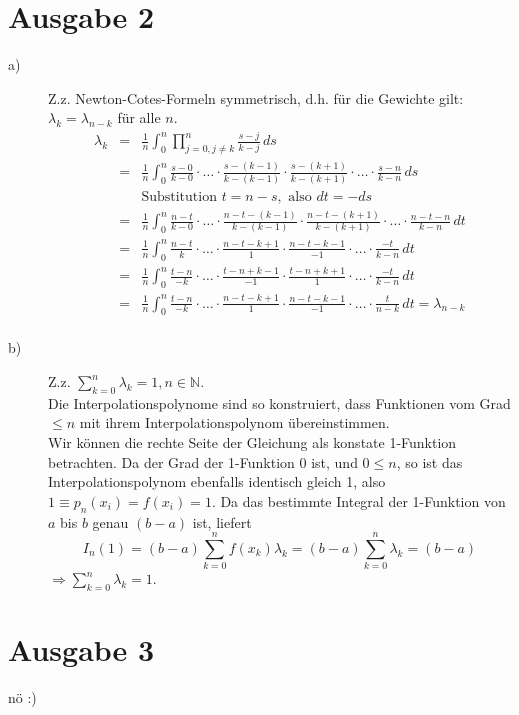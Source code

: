 \documentclass[11pt,a4paper,ngerman]{article}
\begin{document}
\newpage

\section*{Ausgabe 2}
\begin{description}
\item[a)] Z.z. Newton-Cotes-Formeln symmetrisch, d.h. für die Gewichte gilt: $\lambda_k = \lambda_{n-k}$ für alle $n$. \\
\begin{eqnarray*}
 \lambda_k &=& \frac{1}{n} \int_0^n{\prod_{j=0,j\neq k}^n{\frac{s-j}{k-j}} \, ds} \\
 &=&\frac{1}{n} \int_0^n{\frac{s-0}{k-0}\cdot \ldots \cdot \frac{s-(k-1)}{k-(k-1)} \cdot \frac{s-(k+1)}{k-(k+1)}\cdot \ldots \cdot \frac{s-n}{k-n} \, ds} \\
 & & \text{Substitution } t = n - s, \text{ also } dt = -ds\\
 &=&\frac{1}{n} \int_0^n{\frac{n-t}{k-0}\cdot \ldots \cdot \frac{n-t-(k-1)}{k-(k-1)} \cdot \frac{n-t-(k+1)}{k-(k+1)}\cdot \ldots \cdot \frac{n-t-n}{k-n} \, dt} \\
 &=&\frac{1}{n} \int_0^n{\frac{n-t}{k}\cdot \ldots \cdot \frac{n-t-k+1}{1} \cdot \frac{n-t-k-1}{-1}\cdot \ldots \cdot \frac{-t}{k-n} \, dt} \\
 &=&\frac{1}{n} \int_0^n{\frac{t-n}{-k}\cdot \ldots \cdot \frac{t-n+k-1}{-1} \cdot \frac{t-n+k+1}{1}\cdot \ldots \cdot \frac{-t}{k-n} \, dt} \\
 &=&\frac{1}{n} \int_0^n{\frac{t-n}{-k}\cdot \ldots \cdot \frac{n-t-k+1}{1} \cdot \frac{n-t-k-1}{-1}\cdot \ldots \cdot \frac{t}{n-k} \, dt} = \lambda_{n-k}\\
\end{eqnarray*}
\item[b)] Z.z. $\sum_{k=0}^{n}{\lambda_k} = 1, n\in \mathbb{N}$. \\
Die Interpolationspolynome sind so konstruiert, dass Funktionen vom Grad $\leq n$ mit ihrem Interpolationspolynom übereinstimmen.\\
Wir können die rechte Seite der Gleichung als konstate 1-Funktion betrachten. Da der Grad der 1-Funktion 0 ist, und $0 \leq n$, so ist das Interpolationspolynom ebenfalls identisch gleich 1, also $1 \equiv p_n(x_i) = f(x_i) = 1$. Da das bestimmte Integral der 1-Funktion von $a$ bis $b$ genau $(b-a)$ ist, liefert
$$ I_n(1) = (b-a) \sum_{k=0}^n{f(x_k)\lambda_k} = (b-a) \sum_{k=0}^n{\lambda_k} = (b-a)$$
$ \Rightarrow \sum_{k=0}^n{\lambda_k}= 1$.

\end{description}

\section*{Ausgabe 3}
nö :)

\label{LastPage}
\end{document}
